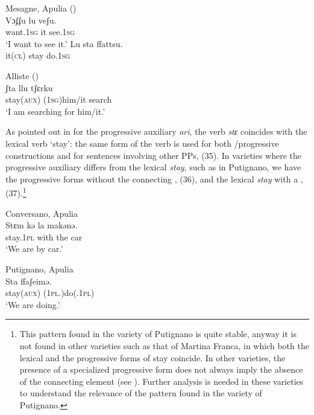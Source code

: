 \documentclass[output=paper]{langsci/langscibook}
\begin{document}
\ea%
    \label{ex:lorusso:33}
    \ea  {}Mesagne, Apulia (\citealt{Manzini2005})\\
    \gll Vɔʄʄu     lu  veʃu.      \\
         want.\textsc{1sg} it   see.\textsc{1sg}\\
    \glt ‘I want to see it.’ 
    \ex 
    \gll Lu   sta   ffattsu.\\
         it\textsc{(cl)}  stay  do.\textsc{1sg}\\
    \z
\z

\ea%
         Alliste (\citealt{Manzini2005})\label{ex:lorusso:34}\\
    \gll ʃta     llu     tʃɛrku    \\
         stay\textsc{(aux)} (\textsc{1sg})him/it  search\\
    \glt ‘I am searching for him/it.’ 
\z

As pointed out in \citet{Laka2006} for the  progressive auxiliary \textit{ari}, the verb \textit{stɛ} coincides with the lexical verb ‘stay’: the same form of the verb is used for both \slash progressive constructions and for sentences involving other PPs, (35). In varieties where the progressive auxiliary differs from the lexical \textit{stay}, such as in Putignano, we have the progressive forms without the connecting , (36), and the lexical \textit{stay} with a , (37).\footnote{This pattern found in the variety of Putignano is quite stable, anyway it is not found in other varieties such as that of Martina Franca, in which both the lexical and the progressive forms of stay coincide. In other varieties, the presence of a specialized progressive form does not always imply the absence of the connecting  element (see \citealt{Manzini2017}). Further analysis is needed in these varieties to understand the relevance of the pattern found in the variety of Putignano.}

\ea%
         Conversano, Apulia\label{ex:lorusso:35}\\
    \gll Stɛm     kə  la   makənə.       \\
         stay.\textsc{1pl} with   the  car \\
    \glt ‘We are by car.’
\z

\ea%
         Putignano, Apulia\label{ex:lorusso:36}\\
    \gll Sta     ffaʃeimə.\\
         stay\textsc{(aux)}   (\textsc{1pl.})do(.\textsc{1pl})        \\
    \glt ‘We are doing.’
    \z
\end{document}
